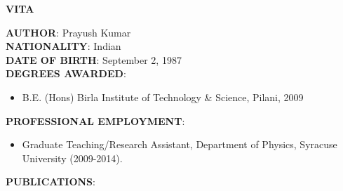 \thispagestyle{empty}
\begin{center}
{\large {\bf VITA}}
\end{center}
\vspace{1cm}
{\bf AUTHOR}: Prayush Kumar \\
{\bf NATIONALITY}: Indian \\
{\bf DATE OF BIRTH}: September 2, 1987 \\
{\bf DEGREES AWARDED}:
\begin{itemize}
\item B.E. (Hons) Birla Institute of Technology \& Science, Pilani, 2009
\end{itemize}
{\bf PROFESSIONAL EMPLOYMENT}:
\begin{itemize}
\item[] Graduate Teaching/Research Assistant, Department of Physics, Syracuse University (2009-2014).
\end{itemize}
{\bf PUBLICATIONS}:
